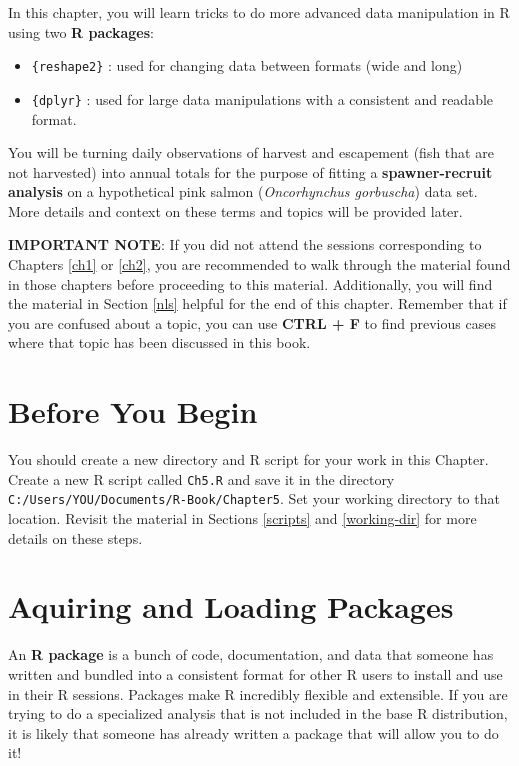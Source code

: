 \documentclass[]{book}
\providecommand{\tightlist}{%
  \setlength{\itemsep}{0pt}\setlength{\parskip}{0pt}}
\theoremstyle{definition}
\theoremstyle{definition}
\theoremstyle{definition}
\theoremstyle{remark}
\begin{document}
In this chapter, you will learn tricks to do more advanced data
manipulation in R using two \textbf{R packages}:

\begin{itemize}
\tightlist
\item
  \texttt{\{reshape2\}} \citep{R-reshape2}: used for changing data
  between formats (wide and long)
\item
  \texttt{\{dplyr\}} \citep{R-dplyr}: used for large data manipulations
  with a consistent and readable format.
\end{itemize}

You will be turning daily observations of harvest and escapement (fish
that are not harvested) into annual totals for the purpose of fitting a
\textbf{spawner-recruit analysis} on a hypothetical pink salmon
(\emph{Oncorhynchus gorbuscha}) data set. More details and context on
these terms and topics will be provided later.

\textbf{IMPORTANT NOTE}: If you did not attend the sessions
corresponding to Chapters \ref{ch1} or \ref{ch2}, you are recommended to
walk through the material found in those chapters before proceeding to
this material. Additionally, you will find the material in Section
\ref{nls} helpful for the end of this chapter. Remember that if you are
confused about a topic, you can use \textbf{CTRL + F} to find previous
cases where that topic has been discussed in this book.

\section*{Before You Begin}\label{before-you-begin-4}

You should create a new directory and R script for your work in this
Chapter. Create a new R script called \texttt{Ch5.R} and save it in the
directory \texttt{C:/Users/YOU/Documents/R-Book/Chapter5}. Set your
working directory to that location. Revisit the material in Sections
\ref{scripts} and \ref{working-dir} for more details on these steps.

\section{Aquiring and Loading
Packages}\label{aquiring-and-loading-packages}

An \textbf{R package} is a bunch of code, documentation, and data that
someone has written and bundled into a consistent format for other R
users to install and use in their R sessions. Packages make R incredibly
flexible and extensible. If you are trying to do a specialized analysis
that is not included in the base R distribution, it is likely that
someone has already written a package that will allow you to do it!
\end{document}
